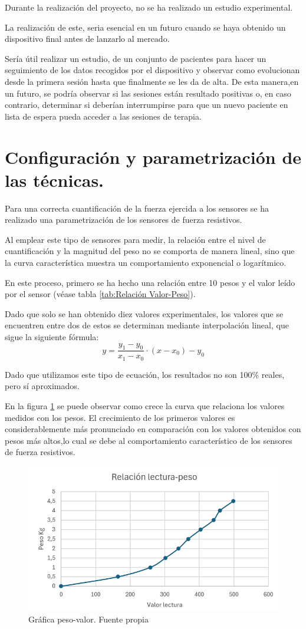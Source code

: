 Durante la realización del proyecto, no se ha realizado un estudio experimental. 

La realización de este, seria esencial en un futuro cuando se haya obtenido un dispositivo final antes de lanzarlo al mercado. 

Sería útil realizar un estudio, de un conjunto de pacientes para hacer un seguimiento de los datos recogidos por el dispositivo y observar como evolucionan desde la primera sesión hasta que finalmente se les da de alta.
De esta manera,en un futuro, se podría observar si las sesiones están resultado positivas o, en caso contrario, determinar si deberían interrumpirse para que un nuevo paciente en lista de espera pueda acceder a las sesiones de terapia.

\section{Configuración y parametrización de las técnicas.}

Para una correcta cuantificación de la fuerza ejercida a los sensores se ha realizado una parametrización de los sensores de fuerza resistivos. 

Al emplear este tipo de sensores para medir, la relación entre el nivel de cuantificación y la magnitud del peso no se comporta de manera lineal, sino que la curva característica muestra un comportamiento exponencial o logarítmico. 

En este proceso, primero se ha hecho una relación entre 10 pesos y el valor leído por el sensor (véase tabla \ref{tab:Relación Valor-Peso}). 


Dado que solo se han obtenido diez valores experimentales, los valores que se encuentren entre dos de estos se determinan mediante interpolación lineal, que sigue la siguiente fórmula:
\begin{equation}
    y = \frac{y_1 - y_0}{x_1 - x_0} \cdot (x - x_0) - y_0
    \label{eq: Interpolación lineal}
\end{equation}

Dado que utilizamos este tipo de ecuación, los resultados no son 100\% reales, pero sí aproximados.

En la figura \ref{fig:Grafica peso-valor} se puede observar como crece la curva que relaciona los valores medidos con los pesos. El crecimiento de los primeros valores es considerablemente más pronunciado en comparación con los valores obtenidos con pesos más altos,lo cual se debe al comportamiento característico de los sensores de fuerza resistivos. 

\begin{figure}
    \centering
    \includegraphics[width=0.75\linewidth]{img/Grafica peso-valor.png}
    \caption{Gráfica peso-valor. Fuente propia}
    \label{fig:Grafica peso-valor}
\end{figure}